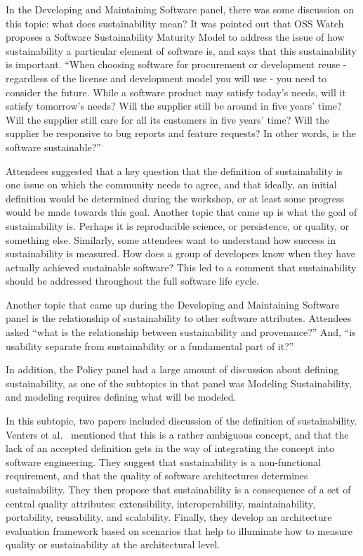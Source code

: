 \documentclass[11pt, oneside]{amsart}
\begin{document}
In the Developing and Maintaining Software panel, there was some discussion on
this topic: what does sustainability mean? It was pointed out that OSS Watch
proposes a Software Sustainability Maturity Model to address the issue of how
sustainability a particular element of software is, and says that this
sustainability is important. ``When choosing software for procurement or
development reuse - regardless of the license and development model you will
use - you need to consider the future. While a software product may satisfy
today's needs, will it satisfy tomorrow's needs? Will the supplier still be
around in five years' time? Will the supplier still care for all its customers
in five years' time? Will the supplier be responsive to bug reports and feature
requests? In other words, is the software sustainable?''~\cite{OSS-ssmm-web}

Attendees suggested that a key question that the definition of sustainability
is one issue on which the community needs to agree, and that ideally, an
initial definition would be determined during the workshop, or at least some
progress would be made towards this goal.  Another topic that came up is what
the goal of sustainability is.  Perhaps it is reproducible science, or
persistence, or quality, or something else.  Similarly, some attendees want to
understand how success in sustainability is measured.  How does a group of
developers know when they have actually achieved sustainable software? This led
to a comment that sustainability should be addressed throughout the full
software life cycle.

Another topic that came up during the Developing and Maintaining Software panel
is the relationship of sustainability to other software attributes.  Attendees
asked ``what is the relationship between sustainability and provenance?'' And,
``is usability separate from sustainability or a fundamental part of it?''

In addition, the Policy panel had a large amount of discussion about defining
sustainability, as one of the subtopics in that panel was Modeling
Sustainability, and modeling requires defining what will be modeled.

In this subtopic, two papers included discussion of the definition of
sustainability.  Venters et al.~\cite{Venters_WSSSPE} mentioned that this is a
rather ambiguous concept, and that the lack of an accepted definition gets in
the way of integrating the concept into software engineering. They suggest that
sustainability is a non-functional requirement, and that the quality of
software architectures determines sustainability. They then propose that
sustainability is a consequence of a set of central quality attributes:
extensibility, interoperability, maintainability, portability, reusability, and
scalability. Finally, they develop an architecture evaluation framework based
on scenarios that help to illuminate how to measure quality or sustainability
at the architectural level.
\end{document}
